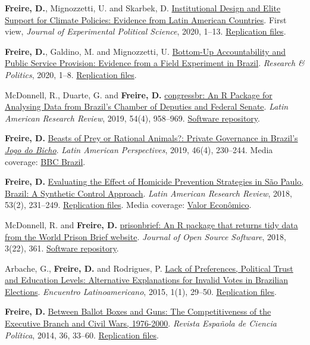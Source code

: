 \documentclass[a4paper]{article}
\renewenvironment{itemize}{
	\begin{list}{}{
			\setlength{\leftmargin}{1.5em}
		}
		}{
	\end{list}
}
\begin{document}
\begin{itemize}
\item \textbf{Freire, D.}, Mignozzetti, U. and Skarbek, D. \href{http://dx.doi.org/10.1017/XPS.2020.19}{Institutional Design and Elite Support for Climate Policies: Evidence from Latin American Countries}. First view, \textit{Journal of Experimental Political Science}, 2020, 1--13. \href{https://doi.org/10.7910/DVN/VTA5OA}{Replication files}.
\item \textbf{Freire, D.}, Galdino, M. and Mignozzetti, U. \href{https://doi.org/10.1177%2F2053168020914444}{Bottom-Up Accountability and Public Service Provision: Evidence from a Field Experiment in Brazil}. \textit{Research \& Politics}, 2020, 1--8. \href{https://github.com/umbertomig/tdp-accountability}{Replication files}.
\item McDonnell, R., Duarte, G. and \textbf{Freire, D.} \href{https://doi.org/10.25222/larr.447}{congressbr: An R Package for Analysing Data from Brazil's Chamber of Deputies and Federal Senate}. \textit{Latin American Research Review}, 2019, 54(4), 958--969. \href{https://github.com/duarteguilherme/congressbr}{Software repository}.
\item \textbf{Freire, D.} \href{https://doi.org/10.1177/0094582X19846519}{Beasts of Prey or Rational Animals?: Private Governance in Brazil's \emph{Jogo do Bicho}}. \textit{Latin American Perspectives}, 2019, 46(4), 230--244. Media coverage: \href{http://www.bbc.com/portuguese/brasil-40140693}{BBC Brazil}.
\item \textbf{Freire, D.} \href{https://larrlasa.org/articles/10.25222/larr.334/}{Evaluating the Effect of Homicide Prevention Strategies in São Paulo, Brazil: A Synthetic Control Approach}. \textit{Latin American Research Review}, 2018, 53(2), 231--249. \href{https://github.com/danilofreire/homicides-sp-synth}{Replication files}. Media coverage: \href{http://www.valor.com.br/cultura/5111524/sangue-no-asfalto}{Valor Econômico}.
\item McDonnell, R. and \textbf{Freire, D.} \href{https://doi.org/10.21105/joss.00361}{prisonbrief: An R package that returns tidy data from the World Prison Brief website}. \textit{Journal of Open Source Software}, 2018, 3(22), 361. \href{https://github.com/danilofreire/prisonbrief}{Software repository}.
\item Arbache, G., \textbf{Freire, D.} and Rodrigues, P. \href{http://www.iapss.org/wp-content/uploads/2014/10/ELA1.1_2.Lack-of-Preferences-Political-Trust-and-Education-Levels.pdf}{Lack of Preferences, Political Trust and Education Levels: Alternative Explanations for Invalid Votes in Brazilian Elections}. \textit{Encuentro Latinoamericano}, 2015, 1(1), 29--50. \href{https://github.com/danilofreire/invalid-votes-brazil}{Replication files}.
\item \textbf{Freire, D.} \href{http://recyt.fecyt.es/index.php/recp/article/view/37638}{Between Ballot Boxes and Guns: The Competitiveness of the Executive Branch and Civil Wars, 1976-2000}. \textit{Revista Española de Ciencia Política}, 2014, 36, 33--60. \href{https://doi.org/10.7910/DVN/NSDUYG}{Replication files}.
\end{itemize}
\end{document}
